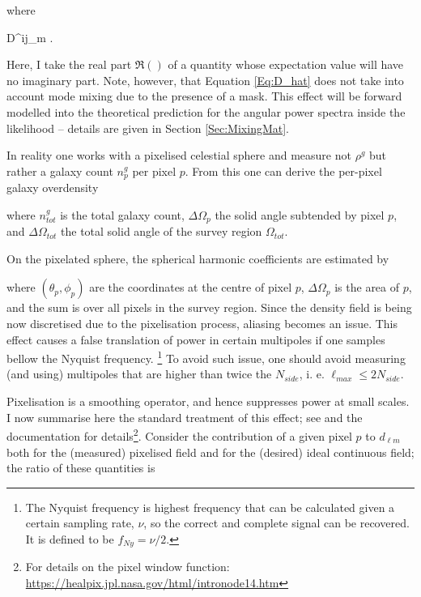 \noindent where

 {
D^{ij}_{\ell m} \equiv {}.
}

\noindent Here, I take the real part $\Re()$ of a quantity whose expectation value will have no imaginary part. Note, however, that Equation \ref{Eq:D_hat} does not take into account mode mixing due to the presence of a mask. This effect will be forward modelled into the theoretical prediction for the angular power spectra inside the likelihood -- details are given in Section \ref{Sec:MixingMat}.

\qquad In reality one works with a pixelised celestial sphere and measure not $\rho^g$ but rather a galaxy count $n^g_p$ per pixel $p$. From this one can derive the per-pixel galaxy overdensity


\noindent where $n^g_{tot}$ is the total galaxy count, $\Delta \Omega_p$ the solid angle subtended by pixel $p$, and $\Delta \Omega_{tot}$ the total solid angle of the survey region $\Omega_{tot}$.

\qquad On the pixelated sphere, the spherical harmonic coefficients are estimated by


\noindent where $(\theta_p,\phi_p)$ are the coordinates at the centre of pixel $p$, $\Delta\Omega_p$ is the area of $p$, and the sum is over all pixels in the survey region. Since the density field is being now discretised due to the pixelisation process, aliasing becomes an issue. This effect causes a false translation of power in certain multipoles if one samples bellow the Nyquist frequency. \footnote{The Nyquist frequency is highest frequency that can be calculated given a certain sampling rate, $\nu$, so the correct and complete signal can be recovered. It is defined to be $f_{Ny} = \nu/2$.} To avoid such issue, one should avoid measuring (and using) multipoles that are higher than twice the $N_{side}$, i. e. $\ell_{max} \leq 2N_{side}$.

\qquad Pixelisation is a smoothing operator, and hence suppresses power at small scales. I now summarise here the standard treatment of this effect; see \cite{Healpix,Boris2013} and the \healpix documentation for details\footnote{For details on the pixel window function: \url{https://healpix.jpl.nasa.gov/html/intronode14.htm}}. Consider the contribution of a given pixel $p$ to $d_{\ell m}$ both for the (measured) pixelised field and for the (desired) ideal continuous field; the ratio of these quantities is 

